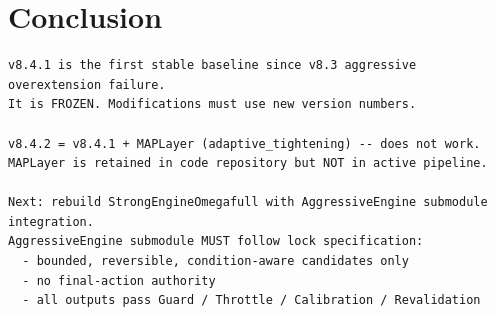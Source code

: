 \documentclass[11pt,a4paper]{article}
\begin{document}
\section{Conclusion}

\begin{verbatim}
v8.4.1 is the first stable baseline since v8.3 aggressive overextension failure.
It is FROZEN. Modifications must use new version numbers.

v8.4.2 = v8.4.1 + MAPLayer (adaptive_tightening) -- does not work.
MAPLayer is retained in code repository but NOT in active pipeline.

Next: rebuild StrongEngineOmegafull with AggressiveEngine submodule integration.
AggressiveEngine submodule MUST follow lock specification:
  - bounded, reversible, condition-aware candidates only
  - no final-action authority
  - all outputs pass Guard / Throttle / Calibration / Revalidation
\end{verbatim}
\end{document}
